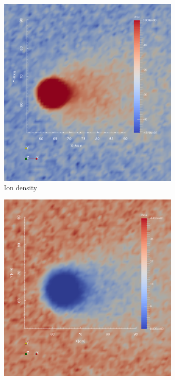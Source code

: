\documentclass[twoside]{article}
\begin{document}
\begin{figure}[h]
\centering
\begin{subfigure}{.5\textwidth}
  \centering
  \includegraphics[width=0.99\linewidth]{rhoi_2sim_oslo_90D.png}
  \caption{Ion density}
  \label{fig:sub81}
\end{subfigure}%
\begin{subfigure}{.5\textwidth}
  \centering
  \includegraphics[width=0.99\linewidth]{rhoe_2sim_oslo_90D.png}

\end{subfigure}
\end{figure}
\end{document}

